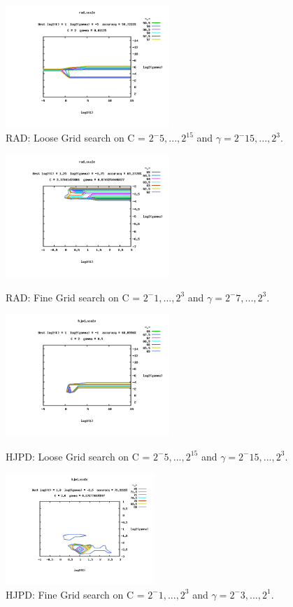 \documentclass[11pt,nocopyrightspace]{config}
\begin{document}
\begin{figure}[h]
	\centering
	\includegraphics[width=0.55\textwidth]{coarseGridRad}
	\caption{RAD: Loose Grid search on C = $2^-5,...,2^15$ and $\gamma=2^-15,...,2^3$.}
	\label{fig:looseRad}
\end{figure}
\begin{figure}[p]
	\includegraphics[width=0.55\textwidth]{fineGridRad}
	\caption{RAD: Fine Grid search on C = $2^-1,...,2^3$ and $\gamma=2^-7,...,2^3$.}
	\label{fig:fineRad}
	\includegraphics[width=0.55\textwidth]{coarseGridHjpd}
	\caption{HJPD: Loose Grid search on C = $2^-5,...,2^15$ and $\gamma=2^-15,...,2^3$.}
	\label{fig:looseHjpd}
	\includegraphics[width=0.5\textwidth]{fineGridHjpd}
	\caption{HJPD: Fine Grid search on C = $2^-1,...,2^3$ and $\gamma=2^-3,...,2^1$.}
	\label{fig:fineHjpd}
\end{figure}
\end{document}
